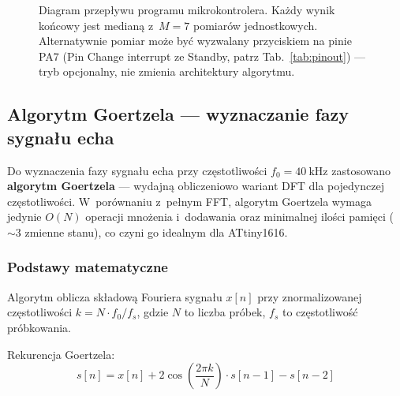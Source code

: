 \documentclass[a4paper,11pt]{article}
\begin{document}
\begin{figure}[H]
		\caption{Diagram przepływu programu mikrokontrolera. Każdy wynik końcowy
			jest medianą z~$M = 7$ pomiarów jednostkowych. Alternatywnie pomiar może
			być wyzwalany przyciskiem na pinie PA7 (Pin Change interrupt ze Standby,
			patrz Tab.~\ref{tab:pinout}) --- tryb opcjonalny, nie zmienia architektury
			algorytmu.}
		\label{fig:flowchart}
	\end{figure}
	
	\subsection{Algorytm Goertzela --- wyznaczanie fazy sygnału echa}
	\label{sec:goertzel}
	
	Do wyznaczenia fazy sygnału echa przy częstotliwości $f_0 = \SI{40}{\kilo\hertz}$
	zastosowano \textbf{algorytm Goertzela} --- wydajną obliczeniowo wariant DFT
	dla pojedynczej częstotliwości. W~porównaniu z~pełnym FFT, algorytm Goertzela
	wymaga jedynie $O(N)$ operacji mnożenia i~dodawania oraz minimalnej ilości
	pamięci (${\sim}3$ zmienne stanu), co czyni go idealnym dla ATtiny1616.
	
	\subsubsection{Podstawy matematyczne}
	
	Algorytm oblicza składową Fouriera sygnału $x[n]$ przy znormalizowanej
	częstotliwości $k = N \cdot f_0 / f_s$, gdzie $N$ to liczba próbek,
	$f_s$ to częstotliwość próbkowania.
	
	Rekurencja Goertzela:
	\begin{equation}
		s[n] = x[n] + 2\cos\!\left(\frac{2\pi k}{N}\right) \cdot s[n-1] - s[n-2]
		\label{eq:goertzel_recur}
	\end{equation}
	
\end{document}
